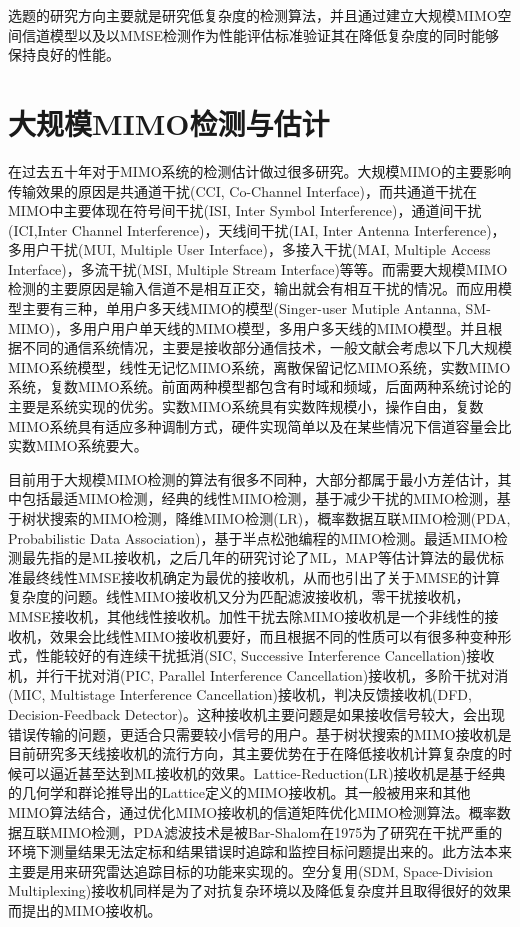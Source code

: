 \documentclass[bachelor,nocolorlinks, printoneside]{seuthesis} %
\begin{document}
\begin{Main}
选题的研究方向主要就是研究低复杂度的检测算法，并且通过建立大规模MIMO空间信道模型以及以MMSE检测作为性能评估标准验证其在降低复杂度的同时能够保持良好的性能。

\section{大规模MIMO检测与估计}
在过去五十年对于MIMO系统的检测估计做过很多研究。大规模MIMO的主要影响传输效果的原因是共通道干扰(CCI, Co-Channel Interface)，而共通道干扰在MIMO中主要体现在符号间干扰(ISI, Inter Symbol Interference)，通道间干扰(ICI,Inter Channel Interference)，天线间干扰(IAI, Inter Antenna Interference)，多用户干扰(MUI, Multiple User Interface)，多接入干扰(MAI, Multiple Access Interface)，多流干扰(MSI, Multiple Stream Interface)等等。而需要大规模MIMO检测的主要原因是输入信道不是相互正交，输出就会有相互干扰的情况。而应用模型主要有三种，单用户多天线MIMO的模型(Singer-user Mutiple Antanna, SM-MIMO)，多用户用户单天线的MIMO模型，多用户多天线的MIMO模型。并且根据不同的通信系统情况，主要是接收部分通信技术，一般文献会考虑以下几大规模MIMO系统模型，线性无记忆MIMO系统，离散保留记忆MIMO系统，实数MIMO系统，复数MIMO系统。前面两种模型都包含有时域和频域，后面两种系统讨论的主要是系统实现的优劣。实数MIMO系统具有实数阵规模小，操作自由，复数MIMO系统具有适应多种调制方式，硬件实现简单以及在某些情况下信道容量会比实数MIMO系统要大\cite{chen2017low}。

目前用于大规模MIMO检测的算法有很多不同种，大部分都属于最小方差估计，其中包括最适MIMO检测，经典的线性MIMO检测\cite{muller2001design}，基于减少干扰的MIMO检测，基于树状搜索的MIMO检测，降维MIMO检测(LR)，概率数据互联MIMO检测(PDA, Probabilistic Data Association)，基于半点松弛编程的MIMO检测。最适MIMO检测最先指的是ML接收机，之后几年的研究讨论了ML，MAP等估计算法的最优标准最终线性MMSE接收机确定为最优的接收机，从而也引出了关于MMSE的计算复杂度的问题。线性MIMO接收机又分为匹配滤波接收机，零干扰接收机，MMSE接收机，其他线性接收机。加性干扰去除MIMO接收机是一个非线性的接收机，效果会比线性MIMO接收机要好，而且根据不同的性质可以有很多种变种形式，性能较好的有连续干扰抵消(SIC, Successive Interference Cancellation)接收机\cite{SICD}，并行干扰对消(PIC, Parallel Interference Cancellation)接收机\cite{PIC}，多阶干扰对消(MIC, Multistage Interference Cancellation)接收机\cite{MICD}，判决反馈接收机(DFD, Decision-Feedback Detector)\cite{DFD}\cite{DFD2}。这种接收机主要问题是如果接收信号较大，会出现错误传输的问题，更适合只需要较小信号的用户。基于树状搜索的MIMO接收机是目前研究多天线接收机的流行方向，其主要优势在于在降低接收机计算复杂度的时候可以逼近甚至达到ML接收机的效果。Lattice-Reduction(LR)接收机是基于经典的几何学和群论推导出的Lattice定义的MIMO接收机\cite{LRDetector}。其一般被用来和其他MIMO算法结合，通过优化MIMO接收机的信道矩阵优化MIMO检测算法。概率数据互联MIMO检测，PDA滤波技术是被Bar-Shalom在1975为了研究在干扰严重的环境下测量结果无法定标和结果错误时追踪和监控目标问题提出来的\cite{PDADector}。此方法本来主要是用来研究雷达追踪目标的功能来实现的。空分复用(SDM, Space-Division Multiplexing)接收机同样是为了对抗复杂环境以及降低复杂度并且取得很好的效果而提出的MIMO接收机。


\end{Main}
\end{document}
